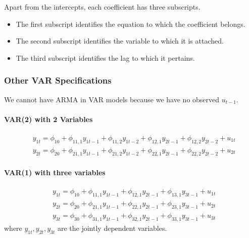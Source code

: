 \documentclass[11pt]{article}
\begin{document}
\begin{note}
Apart from the intercepts, each coefficient has three subscripts.
\begin{itemize}
    \item The first subscript identifies the equation to which the coefficient belongs.
    \item The second subscript identifies the variable to which it is attached.
    \item The third subscript identifies the lag to which it pertains.
\end{itemize}
\end{note}

\subsubsection{Other VAR Specifications}
\begin{note}
    We cannot have ARMA in VAR models because we have no observed $u_{t-1}$.
\end{note}

\paragraph{VAR(2) with 2 Variables}

\begin{equation}
\begin{aligned}
& y_{1 t}=\phi_{10}+\phi_{11,1} y_{1 t-1}+\phi_{11,2} y_{1 t-2}+\phi_{12,1} y_{2 t-1}+\phi_{12,2} y_{2 t-2}+u_{1 t} \\
& y_{2 t}=\phi_{20}+\phi_{21,1} y_{1 t-1}+\phi_{21,2} y_{1 t-2}+\phi_{22,1} y_{2 t-1}+\phi_{22,2} y_{2 t-2}+u_{2 t}
\end{aligned}
\end{equation}

\paragraph{VAR(1) with three variables}

\begin{equation}
\begin{aligned}
& y_{1 t}=\phi_{10}+\phi_{11,1} y_{1 t-1}+\phi_{12,1} y_{2 t-1}+\phi_{13,1} y_{3 t-1}+u_{1 t} \\
& y_{2 t}=\phi_{20}+\phi_{21,1} y_{1 t-1}+\phi_{22,1} y_{2 t-1}+\phi_{23,1} y_{3 t-1}+u_{2 t} \\
& y_{3 t}=\phi_{30}+\phi_{31,1} y_{1 t-1}+\phi_{32,1} y_{2 t-1}+\phi_{33,1} y_{3 t-1}+u_{3 t}
\end{aligned}
\end{equation}
where $y_{1t}, y_{2t}, y_{3t}$ are the jointly dependent variables.
\end{document}
